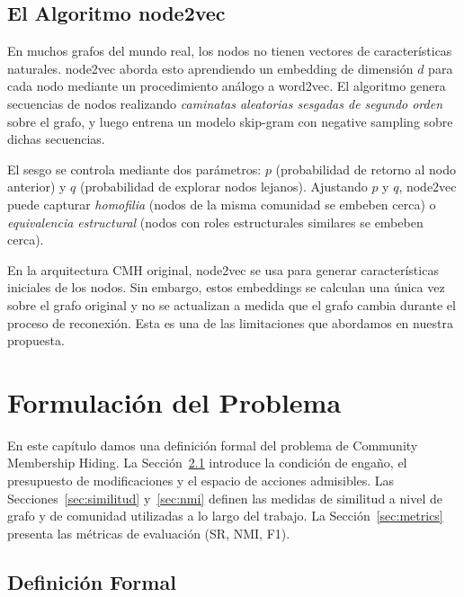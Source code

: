 \documentclass[11pt,a4paper,twoside]{tesis}
\begin{document}
\section{El Algoritmo node2vec}
\label{sec:node2vec}

En muchos grafos del mundo real, los nodos no tienen vectores de características
naturales. node2vec \cite{grover2016node2vec} aborda esto aprendiendo un embedding de
dimensión $d$ para cada nodo mediante un procedimiento análogo a word2vec. El algoritmo
genera secuencias de nodos realizando \emph{caminatas aleatorias sesgadas de segundo
orden} sobre el grafo, y luego entrena un modelo skip-gram con negative sampling sobre
dichas secuencias.

El sesgo se controla mediante dos parámetros: $p$ (probabilidad de retorno al nodo
anterior) y $q$ (probabilidad de explorar nodos lejanos). Ajustando $p$ y $q$, node2vec
puede capturar \emph{homofilia} (nodos de la misma comunidad se embeben cerca) o
\emph{equivalencia estructural} (nodos con roles estructurales similares se embeben
cerca).

En la arquitectura CMH original, node2vec se usa para generar características iniciales
de los nodos. Sin embargo, estos embeddings se calculan una única vez sobre el grafo
original y no se actualizan a medida que el grafo cambia durante el proceso de
reconexión. Esta es una de las limitaciones que abordamos en nuestra propuesta.


\chapter{Formulación del Problema}
\label{ch:problem}

En este capítulo damos una definición formal del problema de Community Membership
Hiding. La Sección~\ref{sec:formal} introduce la condición de engaño, el presupuesto
de modificaciones y el espacio de acciones admisibles. Las Secciones~\ref{sec:similitud}
y~\ref{sec:nmi} definen las medidas de similitud a nivel de grafo y de comunidad
utilizadas a lo largo del trabajo. La Sección~\ref{sec:metrics} presenta las métricas
de evaluación (SR, NMI, F1).

\section{Definición Formal}
\label{sec:formal}
\end{document}
